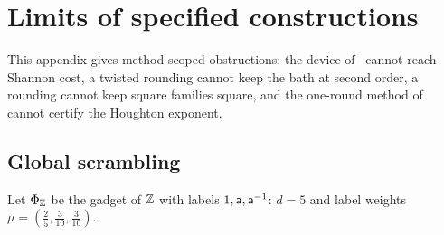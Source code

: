 \section{Limits of specified constructions}\label{sec:obstructions}

This appendix gives method-scoped obstructions: the device of~\cite[Theorem~12.2]{DouglasMghirbiC} cannot reach Shannon cost, a twisted rounding
cannot keep the bath at second order, a rounding cannot keep square families square, and the one-round method of~\cite{DouglasMghirbiB} cannot
certify the Houghton exponent.

\subsection{Global scrambling}

Let $\Phi_\mathbb Z$ be the gadget of $\mathbb Z$ with labels $1,\mathsf a,\mathsf a^{-1}$: $d=5$ and label weights $\mu=(\frac25,\frac3{10},\frac3{10})$.

